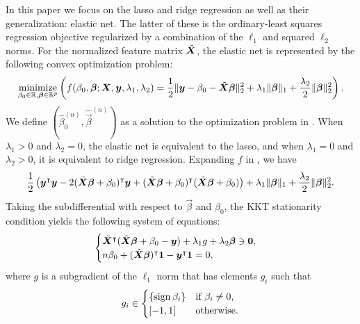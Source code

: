 In this paper we focus on the lasso and ridge regression as well as their generalization:
elastic net. The latter of these is the ordinary-least squares regression objective
regularized by a combination of the \(\ell_1\) and squared \(\ell_2\) norms. For the
normalized feature matrix \(\tilde{\boldsymbol{X}}\), the elastic net is represented by the
following convex optimization problem:
\begin{equation}
  \label{eq:elastic-net}
  \operatorname*{minimize}_{\beta_0 \in \mathbb{R},\boldsymbol{\beta} \in \mathbb{R}^p}\left( f(\beta_0, \boldsymbol{\beta};\boldsymbol{X},\boldsymbol{y},\lambda_1,\lambda_2)=\frac{1}{2} \lVert \boldsymbol y - \beta_0 - \tilde{\boldsymbol{X}}\boldsymbol{\beta} \rVert^2_2  + \lambda_1 \lVert \boldsymbol\beta \rVert_1 + \frac{\lambda_2}{2}\lVert \boldsymbol \beta \rVert_2^2\right).
\end{equation}
We define \((\hat{\beta}_0^{(n)}, \hat{\vec{\beta}}^{(n)})\) as a solution to the optimization problem in .
When \(\lambda_1 > 0\) and \(\lambda_2 = 0\), the elastic net is equivalent to the lasso, and when \(\lambda_1 = 0\) and \(\lambda_2 > 0\), it is equivalent to ridge regression. Expanding \(f\) in , we have
\[
  \begin{aligned}
    \frac{1}{2}\left( \boldsymbol y^\intercal \boldsymbol y - 2(\tilde{\boldsymbol{X}}\boldsymbol{\beta} + \beta_0)^\intercal\boldsymbol{y} + (\tilde{\boldsymbol{X}}\boldsymbol{\beta} + \beta_0)^\intercal(\tilde{\boldsymbol{X}}\boldsymbol{\beta} + \beta_0)\right) + \lambda_1 \lVert \boldsymbol\beta \rVert_1 + \frac{\lambda_2}{2}\lVert \boldsymbol \beta \rVert_2^2.
  \end{aligned}
\]
Taking the subdifferential with respect to \(\vec{\beta}\) and \(\beta_0\), the KKT
stationarity condition yields the following system of equations:
\begin{equation}
  \label{eq:kkt-elasticnet}
  \begin{cases}
    \tilde{\boldsymbol{X}}^\intercal(\tilde{\boldsymbol{X}}\boldsymbol{\beta} + \beta_0 - \boldsymbol{y}) + \lambda_1 g + \lambda_2 \boldsymbol\beta \ni \boldsymbol{0}, \\
    n \beta_0 + (\tilde{\boldsymbol{X}}\boldsymbol{\beta})^\intercal \boldsymbol{1} - \boldsymbol{y}^\intercal \boldsymbol{1} = 0,
  \end{cases}
\end{equation}
where \(g\) is a subgradient of the \(\ell_1\) norm that has elements \(g_i\) such that
\[
  g_i \in
  \begin{cases}
    \{\operatorname{sign}{\beta_i}\} & \text{if } \beta_i \neq 0, \\
    [-1, 1]            & \text{otherwise}.
  \end{cases}
\]


